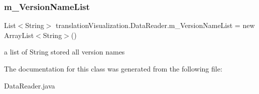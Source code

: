 \subsubsection{\texorpdfstring{m\+\_\+\+Version\+Name\+List}{m\_VersionNameList}}
{\footnotesize\ttfamily List$<$String$>$ translation\+Visualization.\+Data\+Reader.\+m\+\_\+\+Version\+Name\+List = new Array\+List$<$String$>$()}

a list of String stored all version names 

The documentation for this class was generated from the following file\+:\begin{DoxyCompactItemize}
\item 
Data\+Reader.\+java\end{DoxyCompactItemize}
